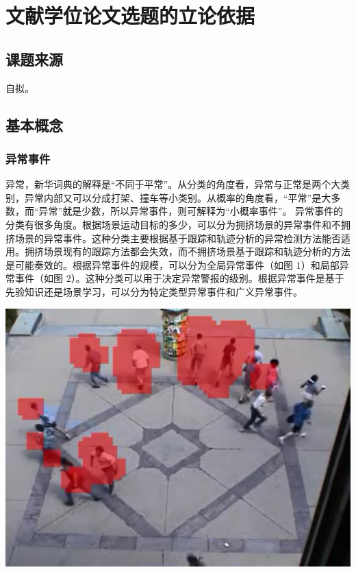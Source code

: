 



\section{文献学位论文选题的立论依据}


\begin{mdframed}[everyline=true]
	
\subsection{课题来源}
自拟。


\subsection{基本概念}
\subsubsection{异常事件}
异常，新华词典的解释是“不同于平常”。从分类的角度看，异常与正常是两个大类别，异常内部又可以分成打架、撞车等小类别。从概率的角度看，“平常”是大多数，而“异常”就是少数，所以异常事件，则可解释为“小概率事件”。
    异常事件的分类有很多角度。根据场景运动目标的多少，可以分为拥挤场景的异常事件和不拥挤场景的异常事件。这种分类主要根据基于跟踪和轨迹分析的异常检测方法能否适用。拥挤场景现有的跟踪方法都会失效，而不拥挤场景基于跟踪和轨迹分析的方法是可能奏效的。根据异常事件的规模，可以分为全局异常事件（如图 1）和局部异常事件（如图 2）。这种分类可以用于决定异常警报的级别。根据异常事件是基于先验知识还是场景学习，可以分为特定类型异常事件和广义异常事件。

\begin{center}
	\includegraphics[width=0.7\linewidth]{Img/fig1}
	\label{fig:fig1}
\end{center}


\end{mdframed}
